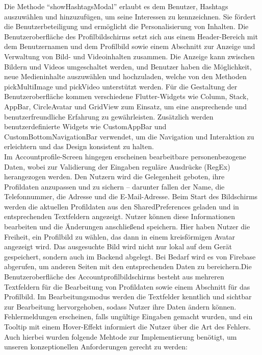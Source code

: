 Die Methode ``showHashtagsModal'' erlaubt es dem Benutzer, Hashtags auszuwählen und hinzuzufügen, um seine Interessen zu kennzeichnen. Sie fördert die Benutzerbeteiligung und ermöglicht die Personalisierung von Inhalten.
Die Benutzeroberfläche des Profilbildschirms setzt sich aus einem Header-Bereich mit dem Benutzernamen und dem Profilbild sowie einem Abschnitt zur Anzeige und Verwaltung von Bild- und Videoinhalten zusammen. 
Die Anzeige kann zwischen Bildern und Videos umgeschaltet werden, und Benutzer haben die Möglichkeit, neue Medieninhalte auszuwählen und hochzuladen, welche von den Methoden pickMultiImage und pickVideo unterstützt werden. 
Für die Gestaltung der Benutzeroberfläche kommen verschiedene Flutter-Widgets wie Column, Stack, AppBar, CircleAvatar und GridView zum Einsatz, um eine ansprechende und benutzerfreundliche Erfahrung zu gewährleisten.
Zusätzlich werden benutzerdefinierte Widgets wie CustomAppBar und CustomBottomNavigationBar verwendet, um die Navigation und Interaktion zu erleichtern und das Design konsistent zu halten.
\\
Im Accountprofile-Screen hingegen erscheinen bearbeitbare personenbezogene Daten, wobei zur Validierung der Eingaben reguläre Ausdrücke (RegEx) herangezogen werden. 
Den Nutzern wird die Gelegenheit geboten, ihre Profildaten anzupassen und zu sichern – darunter fallen der Name, die Telefonnummer, die Adresse und die E-Mail-Adresse. 
Beim Start des Bildschirms werden die aktuellen Profildaten aus den SharedPreferences geladen und in entsprechenden Textfeldern angezeigt. 
Nutzer können diese Informationen bearbeiten und die Änderungen anschließend speichern. Hier haben Nutzer die Freiheit, ein Profilbild zu wählen, das dann in einem kreisförmigen Avatar angezeigt wird. 
Das ausgesuchte Bild wird nicht nur lokal auf dem Gerät gespeichert, sondern auch im Backend abgelegt. Bei Bedarf wird es von Firebase abgerufen, um anderen Seiten mit den entsprechenden Daten zu bereichern.Die Benutzeroberfläche des Accountprofilbildschirms besteht aus mehreren Textfeldern für die Bearbeitung von Profildaten sowie einem Abschnitt für das Profilbild. 
Im Bearbeitungsmodus werden die Textfelder kenntlich und sichtbar zur Bearbeitung hervorgehoben, sodass Nutzer ihre Daten ändern können. Fehlermeldungen erscheinen, falls ungültige Eingaben gemacht wurden, und ein Tooltip mit einem Hover-Effekt informiert die Nutzer über die Art des Fehlers.
Auch hierbei wurden folgende Mehtode zur Implementierung benötigt, um unseren konzeptionellen Anforderungen gerecht zu werden: 
\\

